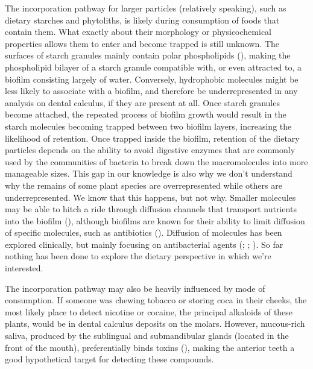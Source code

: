 \documentclass[
  b5paper,
]{book}
\begin{document}
The incorporation pathway for larger particles (relatively speaking),
such as dietary starches and phytoliths, is likely during consumption of
foods that contain them. What exactly about their morphology or
physicochemical properties allows them to enter and become trapped is
still unknown. The surfaces of starch granules mainly contain polar
phospholipids
(), making the phospholipid bilayer of a starch granule
compatible with, or even attracted to, a biofilm consisting largely of
water. Conversely, hydrophobic molecules might be less likely to
associate with a biofilm, and therefore be underrepresented in any
analysis on dental calculus, if they are present at all. Once starch
granules become attached, the repeated process of biofilm growth would
result in the starch molecules becoming trapped between two biofilm
layers, increasing the likelihood of retention. Once trapped inside the
biofilm, retention of the dietary particles depends on the ability to
avoid digestive enzymes that are commonly used by the communities of
bacteria to break down the macromolecules into more manageable sizes.
This gap in our knowledge is also why we don't understand why the
remains of some plant species are overrepresented while others are
underrepresented. We know that this happens, but not why. Smaller
molecules may be able to hitch a ride through diffusion channels that
transport nutrients into the biofilm
(),
although biofilms are known for their ability to limit diffusion of
specific molecules, such as antibiotics
().
Diffusion of molecules has been explored clinically, but mainly focusing
on antibacterial agents (; ; ). So far nothing has been done to explore the dietary
perspective in which we're interested.

The incorporation pathway may also be heavily influenced by mode of
consumption. If someone was chewing tobacco or storing coca in their
cheeks, the most likely place to detect nicotine or cocaine, the
principal alkaloids of these plants, would be in dental calculus
deposits on the molars. However, mucous-rich saliva, produced by the
sublingual and submandibular glands (located in the front of the mouth),
preferentially binds toxins
(), making the
anterior teeth a good hypothetical target for detecting these compounds.
\end{document}
